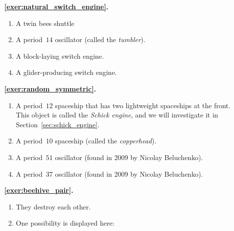 \begin{multicols}{2}
	\begin{itemize}[leftmargin=0em]
		\item[\bf\color{ocre}\sffamily\ref{exer:natural_switch_engine}.] \begin{enumerate}[leftmargin=1.5em,label=\bf\color{ocre}(\alph*)]
			\item A twin bees shuttle
			
			\item A period~$14$ oscillator (called the \emph{tumbler}).
			
			\item A block-laying switch engine.
			
			\item A glider-producing switch engine. \\
		\end{enumerate}
		
		
		\item[\bf\color{ocre}\sffamily\ref{exer:random_symmetric}.] \begin{enumerate}[leftmargin=1.5em,label=\bf\color{ocre}(\alph*)]
			\item A period~$12$ spaceship that has two lightweight spaceships at the front. This object is called the \emph{Schick engine}, and we will investigate it in Section~\ref{sec:schick_engine}.
			
			\item A period~$10$ spaceship (called the \emph{copperhead}).
			
			\item A period~$51$ oscillator (found in 2009 by Nicolay Beluchenko).
			
			\item A period~$37$ oscillator (found in 2009 by Nicolay Beluchenko). \\
		\end{enumerate}
		
		
		\item[\bf\color{ocre}\sffamily\ref{exer:beehive_pair}.] \begin{enumerate}[leftmargin=1.5em,label=\bf\color{ocre}(\alph*)]
			\item They destroy each other.
			
			\item One possibility is displayed here: \\[-0.6em]
			
			 \\
		\end{enumerate}
		

\end{itemize}
\end{multicols}
